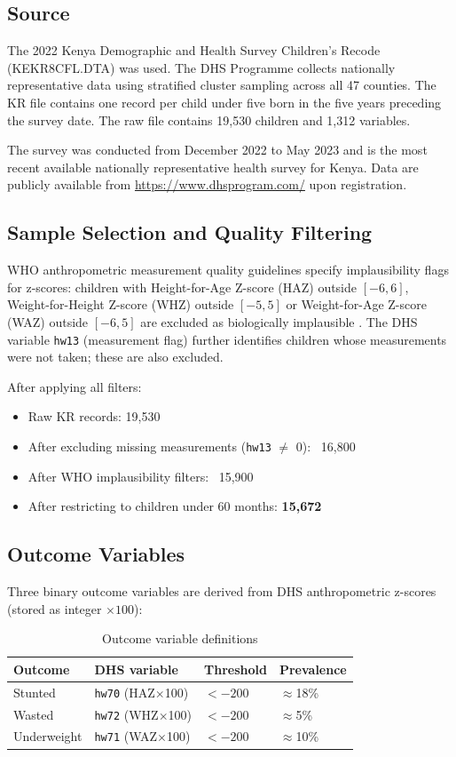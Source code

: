 \documentclass[12pt, a4paper]{article}
\begin{document}
\subsection{Source}
The 2022 Kenya Demographic and Health Survey Children's Recode
(KEKR8CFL.DTA) was used. The DHS Programme collects nationally
representative data using stratified cluster sampling across all 47
counties. The KR file contains one record per child under five born
in the five years preceding the survey date. The raw file contains
19,530 children and 1,312 variables.

The survey was conducted from December 2022 to May 2023 and is the
most recent available nationally representative health survey for Kenya.
Data are publicly available from \url{https://www.dhsprogram.com/}
upon registration.

\subsection{Sample Selection and Quality Filtering}

WHO anthropometric measurement quality guidelines specify implausibility
flags for z-scores: children with Height-for-Age Z-score (HAZ) outside
$[-6, 6]$, Weight-for-Height Z-score (WHZ) outside $[-5, 5]$ or
Weight-for-Age Z-score (WAZ) outside $[-6, 5]$ are excluded as
biologically implausible \citep{WHO2006}. The DHS variable \texttt{hw13}
(measurement flag) further identifies children whose measurements were
not taken; these are also excluded.

After applying all filters:
\begin{itemize}[noitemsep]
    \item Raw KR records: 19,530
    \item After excluding missing measurements (\texttt{hw13} $\neq$ 0): ~16,800
    \item After WHO implausibility filters: ~15,900
    \item After restricting to children under 60 months: \textbf{15,672}
\end{itemize}

\subsection{Outcome Variables}
Three binary outcome variables are derived from DHS anthropometric
z-scores (stored as integer $\times 100$):

\begin{table}[H]
\centering
\caption{Outcome variable definitions}
\begin{tabular}{llll}
\toprule
\textbf{Outcome} & \textbf{DHS variable} & \textbf{Threshold} &
\textbf{Prevalence} \\
\midrule
Stunted     & \texttt{hw70} (HAZ$\times$100) & $< -200$ & $\approx$18\% \\
Wasted      & \texttt{hw72} (WHZ$\times$100) & $< -200$ & $\approx$5\% \\
Underweight & \texttt{hw71} (WAZ$\times$100) & $< -200$ & $\approx$10\% \\
\bottomrule
\end{tabular}
\end{table}
\end{document}
